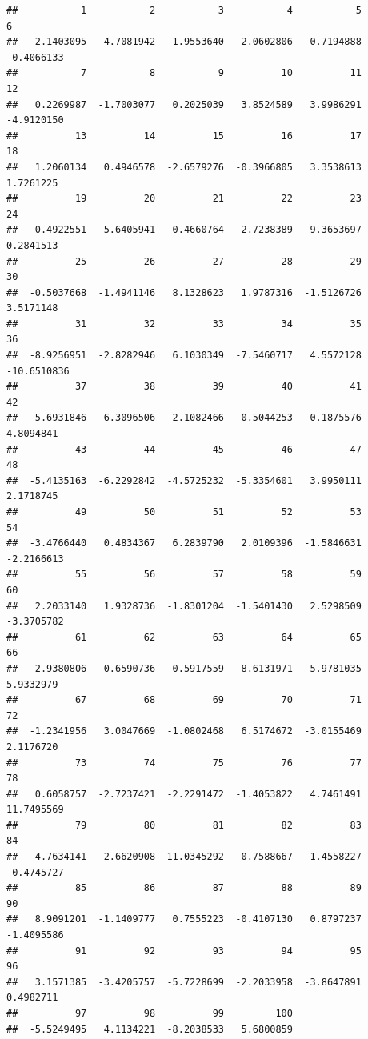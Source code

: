 \documentclass[
]{book}
\begin{document}
\begin{verbatim}
##           1           2           3           4           5           6 
##  -2.1403095   4.7081942   1.9553640  -2.0602806   0.7194888  -0.4066133 
##           7           8           9          10          11          12 
##   0.2269987  -1.7003077   0.2025039   3.8524589   3.9986291  -4.9120150 
##          13          14          15          16          17          18 
##   1.2060134   0.4946578  -2.6579276  -0.3966805   3.3538613   1.7261225 
##          19          20          21          22          23          24 
##  -0.4922551  -5.6405941  -0.4660764   2.7238389   9.3653697   0.2841513 
##          25          26          27          28          29          30 
##  -0.5037668  -1.4941146   8.1328623   1.9787316  -1.5126726   3.5171148 
##          31          32          33          34          35          36 
##  -8.9256951  -2.8282946   6.1030349  -7.5460717   4.5572128 -10.6510836 
##          37          38          39          40          41          42 
##  -5.6931846   6.3096506  -2.1082466  -0.5044253   0.1875576   4.8094841 
##          43          44          45          46          47          48 
##  -5.4135163  -6.2292842  -4.5725232  -5.3354601   3.9950111   2.1718745 
##          49          50          51          52          53          54 
##  -3.4766440   0.4834367   6.2839790   2.0109396  -1.5846631  -2.2166613 
##          55          56          57          58          59          60 
##   2.2033140   1.9328736  -1.8301204  -1.5401430   2.5298509  -3.3705782 
##          61          62          63          64          65          66 
##  -2.9380806   0.6590736  -0.5917559  -8.6131971   5.9781035   5.9332979 
##          67          68          69          70          71          72 
##  -1.2341956   3.0047669  -1.0802468   6.5174672  -3.0155469   2.1176720 
##          73          74          75          76          77          78 
##   0.6058757  -2.7237421  -2.2291472  -1.4053822   4.7461491  11.7495569 
##          79          80          81          82          83          84 
##   4.7634141   2.6620908 -11.0345292  -0.7588667   1.4558227  -0.4745727 
##          85          86          87          88          89          90 
##   8.9091201  -1.1409777   0.7555223  -0.4107130   0.8797237  -1.4095586 
##          91          92          93          94          95          96 
##   3.1571385  -3.4205757  -5.7228699  -2.2033958  -3.8647891   0.4982711 
##          97          98          99         100 
##  -5.5249495   4.1134221  -8.2038533   5.6800859
\end{verbatim}
\end{document}
